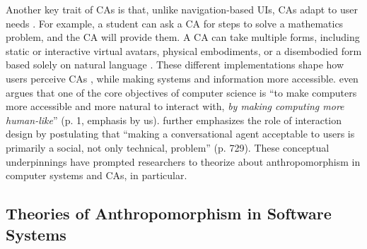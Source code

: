 \documentclass[preprint,review,12pt,authoryear,nonatbib]{elsarticle}
\begin{document}
Another key trait of CAs is that, unlike navigation-based UIs, CAs adapt to user needs \parencite{folstad2017chatbots,jain2018evaluating}. For example, a student can ask a CA for steps to solve a mathematics problem, and the CA will provide them. A CA can take multiple forms, including static or interactive virtual avatars, physical embodiments, or a disembodied form based solely on natural language \parencite{diederich_conversational_2019,diederich_design_2022}. These different implementations shape how users perceive CAs \parencite{peter_benefits_2025}, while making systems and information more accessible. \textcite{peter_benefits_2025} even argues that one of the core objectives of computer science is ``to make computers more accessible and more natural to interact with, \textit{by making computing more human-like}'' (p. 1, emphasis by us). \textcite{chaves2021should} further emphasizes the role of interaction design by postulating that ``making a conversational agent acceptable to users is primarily a social, not only technical, problem'' (p. 729). These conceptual underpinnings have prompted researchers to theorize about anthropomorphism in computer systems and CAs, in particular.


\subsection{Theories of Anthropomorphism in Software Systems}

\end{document}
